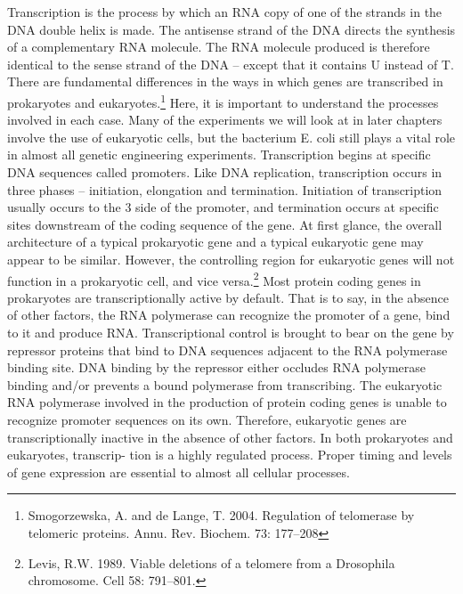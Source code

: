 Transcription is the process by which an RNA copy of one of the strands in
the DNA double helix is made. The antisense strand of the DNA directs the
synthesis of a complementary RNA molecule. The RNA molecule produced is
therefore identical to the sense strand of the DNA – except that it contains U
instead of T. There are fundamental differences in the ways in which genes are
transcribed in prokaryotes and eukaryotes.\footnote{Smogorzewska, A. and de Lange, T. 2004. Regulation of telomerase by
telomeric proteins. Annu. Rev. Biochem. 73: 177–208} Here, it is important to understand
the processes involved in each case. Many of the experiments we will look at
in later chapters involve the use of eukaryotic cells, but the bacterium E. coli
still plays a vital role in almost all genetic engineering experiments.
Transcription begins at specific DNA sequences called promoters. Like DNA
replication, transcription occurs in three phases – initiation, elongation and
termination. Initiation of transcription usually occurs to the 3 side of the
promoter, and termination occurs at specific sites downstream of the coding
sequence of the gene. At first glance, the overall architecture of a typical
prokaryotic gene and a typical eukaryotic gene may appear to be similar. However, the controlling region for eukaryotic genes will not
function in a prokaryotic cell, and vice versa.\footnote{Levis, R.W. 1989. Viable deletions of a telomere from a Drosophila
chromosome. Cell 58: 791–801.}
Most protein coding genes in prokaryotes are transcriptionally active by
default. That is to say, in the absence of other factors, the RNA polymerase can
recognize the promoter of a gene, bind to it and produce RNA. Transcriptional
control is brought to bear on the gene by repressor proteins that bind to DNA
sequences adjacent to the RNA polymerase binding site. DNA binding by the
repressor either occludes RNA polymerase binding and/or prevents a bound
polymerase from transcribing. The eukaryotic RNA polymerase involved in the
production of protein coding genes is unable to recognize promoter
sequences on its own. Therefore, eukaryotic genes are transcriptionally inactive
in the absence of other factors. In both prokaryotes and eukaryotes, transcrip-
tion is a highly regulated process. Proper timing and levels of gene expression
are essential to almost all cellular processes.